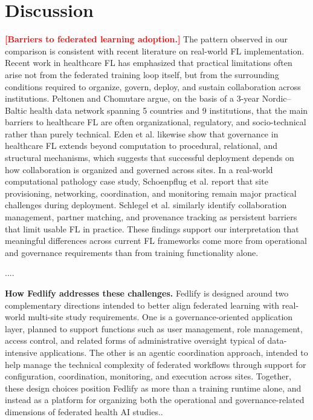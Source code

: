 \documentclass[preprint,5p, 10pt, times]{elsarticle}
\begin{document}
\section*{Discussion}

\textcolor{red}{\textbf{[Barriers to federated learning adoption.]}}
The pattern observed in our comparison is consistent with recent literature on real-world FL implementation. Recent work in healthcare FL has emphasized that practical limitations often arise not from the federated training loop itself, but from the surrounding conditions required to organize, govern, deploy, and sustain collaboration across institutions. 
Peltonen and Chomutare argue, on the basis of a 3-year Nordic–Baltic health data network spanning 5 countries and 9 institutions, that the main barriers to healthcare FL are often organizational, regulatory, and socio-technical rather than purely technical\cite{peltonen2026federated}. 
Eden et al. likewise show that governance in healthcare FL extends beyond computation to procedural, relational, and structural mechanisms, which suggests that successful deployment depends on how collaboration is organized and governed across sites\cite{eden2025scoping}. 
In a real-world computational pathology case study, Schoenpflug et al.  report that site provisioning, networking, coordination, and monitoring remain major practical challenges during deployment\cite{schoenpflug2025navigating}. 
Schlegel et al. similarly identify collaboration management, partner matching, and provenance tracking as persistent barriers that limit usable FL in practice\cite{schlegel2026lowering}.
These findings support our interpretation that meaningful differences across current FL frameworks come more from operational and governance requirements than from training functionality alone.


....

\textbf{How Fedlify addresses these challenges.} Fedlify is designed around two complementary directions intended to better align federated learning with real-world multi-site study requirements. One is a governance-oriented application layer, planned to support functions such as user management, role management, access control, and related forms of administrative oversight typical of data-intensive applications. The other is an agentic coordination approach, intended to help manage the technical complexity of federated workflows through support for configuration, coordination, monitoring, and execution across sites. Together, these design choices position Fedlify as more than a training runtime alone, and instead as a platform for organizing both the operational and governance-related dimensions of federated health AI studies..
\end{document}
